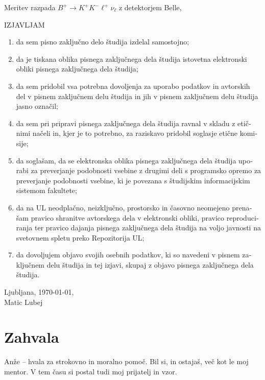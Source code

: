 \begin{otherlanguage}{slovene}
Meritev razpada ${B^+ \to K^+K^-\ell^+\nu_\ell}$ z detektorjem Belle,\\

\begin{center}
IZJAVLJAM
\end{center}

\begin{enumerate}
	\item da sem pisno zaključno delo študija izdelal samostojno$;$
	\item da je tiskana oblika pisnega zaključnega dela študija istovetna elektronski obliki pisnega zaključnega dela študija$;$
	\item da sem pridobil vsa potrebna dovoljenja za uporabo podatkov in avtorskih del v pisnem zaključnem delu študija in jih v pisnem zaključnem delu študija jasno označil$;$
	\item da sem pri pripravi pisnega zaključnega dela študija ravnal v skladu z etičnimi načeli in, kjer je to potrebno, za raziskavo pridobil soglasje etične komisije$;$
	\item da soglašam, da se elektronska oblika pisnega zaključnega dela študija uporabi za preverjanje podobnosti vsebine z drugimi deli s programsko opremo za preverjanje podobnosti vsebine, ki je povezana s študijskim informacijskim sistemom fakultete$;$
	\item da na UL neodplačno, neizključno, prostorsko in časovno neomejeno prenašam pravico shranitve avtorskega dela v elektronski obliki, pravico reproduciranja ter pravico dajanja pisnega zaključnega dela študija na voljo javnosti na svetovnem spletu preko Repozitorija UL$;$
	\item da dovoljujem objavo svojih osebnih podatkov, ki so navedeni v pisnem zaključnem delu študija in tej izjavi, skupaj z objavo pisnega zaključnega dela študija.
\end{enumerate}
\vspace{1cm}
\noindent Ljubljana, \today,\\
\vspace{1cm}
\hfill Matic Lubej


\cleardoublepage

\pagestyle{plain}
\vfill
\chapter*{Zahvala}

\noindent Anže -- hvala za strokovno in moralno pomoč. Bil si, in ostajaš, več kot le moj mentor. V tem času si postal tudi moj prijatelj in vzor.\\


\end{otherlanguage}

